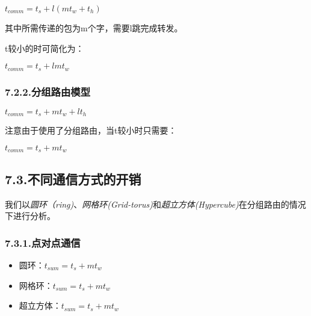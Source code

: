 \documentclass{article}
\begin{document}
\noindent{}$t_{comm} = t_s +l(mt_w+t_h)$%

其中所需传递的包为m个字，需要l跳完成转发。%

t较小的时可简化为：%

$t_{comm} = t_s + lmt_w$%

\subsubsection{7.2.2.\hspace*{0.5em}分组路由模型}\label{section}%

\noindent{}$t_{comm} = t_s + mt_w+ lt_h$%

注意由于使用了分组路由，当t较小时只需要：%

$t_{comm} = t_s + mt_w$%

\subsection{7.3.\hspace*{0.5em}不同通信方式的开销}\label{section}%

\noindent{}我们以\emph{圆环（ring)}、\emph{网格环(Grid-torus)}和\emph{超立方体(Hypercube)}在分组路由的情况下进行分析。%

\subsubsection{7.3.1.\hspace*{0.5em}点对点通信}\label{section}%

\begin{itemize}[noitemsep,topsep=\mdcompacttopsep]%

\item{}圆环：$t_{sum} = t_s + mt_w$%

\item{}网格环：$t_{sum} = t_s + mt_w$%

\item{}超立方体：$t_{sum} = t_s + mt_w$%
\end{itemize}%
\end{document}
